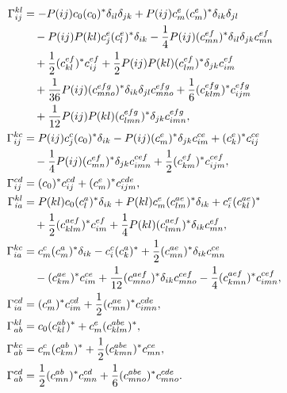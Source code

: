 \documentclass[11pt]{article}
\begin{document}
\begingroup
\small
\begin{align}
 \Gamma^{kl}_{ij}
 &= -P(ij)c_0(c_0)^*\delta_{il}\delta_{jk}
    +P(ij)c_m^e(c_m^e)^*\delta_{ik}\delta_{jl}
 \notag\\
 &\quad
    -P(ij)P(kl)c_j^e(c_l^e)^*\delta_{ik}
    -\frac{1}{4}P(ij)(c_{mn}^{ef})^*
       \delta_{il}\delta_{jk}c_{mn}^{ef}
 \notag\\
 &\quad
    +\frac{1}{2}(c_{kl}^{ef})^*c_{ij}^{ef}
    +\frac{1}{2}P(ij)P(kl)(c_{lm}^{ef})^*
       \delta_{jk}c_{im}^{ef}
 \notag\\
 &\quad
    +\frac{1}{36}P(ij)(c_{mno}^{efg})^*
       \delta_{ik}\delta_{jl}c_{mno}^{efg}
    +\frac{1}{6}(c_{klm}^{efg})^*c_{ijm}^{efg}
 \notag\\
 &\quad
    +\frac{1}{12}P(ij)P(kl)(c_{lmn}^{efg})^*
       \delta_{jk}c_{imn}^{efg},
 \\
 \Gamma^{kc}_{ij}
 &= P(ij)c_j^c(c_0)^*\delta_{ik}
    -P(ij)(c_m^e)^*\delta_{jk}c_{im}^{ce}
    +(c_k^e)^*c_{ij}^{ce}
 \notag\\
 &\quad
    -\frac{1}{4}P(ij)(c_{mn}^{ef})^*\delta_{jk}c_{imn}^{cef}
    +\frac{1}{2}(c_{km}^{ef})^*c_{ijm}^{cef},
 \\
 \Gamma^{cd}_{ij}
 &= (c_0)^*c_{ij}^{cd}+(c_m^e)^*c_{ijm}^{cde},
 \\
 \Gamma^{kl}_{ia}
 &= P(kl)c_0(c_l^a)^*\delta_{ik}
    +P(kl)c_m^e(c_{lm}^{ae})^*\delta_{ik}
    +c_i^e(c_{kl}^{ae})^*
 \notag\\
 &\quad
    +\frac{1}{2}(c_{klm}^{aef})^*c_{im}^{ef}
    +\frac{1}{4}P(kl)(c_{lmn}^{aef})^*\delta_{ik}c_{mn}^{ef},
 \\
 \Gamma^{kc}_{ia}
 &= c_m^c(c_m^a)^*\delta_{ik}-c_i^c(c_k^a)^*
    +\frac{1}{2}(c_{mn}^{ae})^*\delta_{ik}c_{mn}^{ce}
 \notag\\
 &\quad
    -(c_{km}^{ae})^*c_{im}^{ce}
    +\frac{1}{12}(c_{mno}^{aef})^*\delta_{ik}c_{mno}^{cef}
    -\frac{1}{4}(c_{kmn}^{aef})^*c_{imn}^{cef},
 \\
 \Gamma^{cd}_{ia}
 &= (c_m^a)^*c_{im}^{cd}
    +\frac{1}{2}(c_{mn}^{ae})^*c_{imn}^{cde},
 \\
 \Gamma^{kl}_{ab}
 &= c_0(c_{kl}^{ab})^*+c_m^e(c_{klm}^{abe})^*,
 \\
 \Gamma^{kc}_{ab}
 &= c_m^c(c_{km}^{ab})^*
    +\frac{1}{2}(c_{kmn}^{abe})^*c_{mn}^{ce},
 \\
 \Gamma^{cd}_{ab}
 &= \frac{1}{2}(c_{mn}^{ab})^*c_{mn}^{cd}
    +\frac{1}{6}(c_{mno}^{abe})^*c_{mno}^{cde}.
\end{align}
\endgroup
\end{document}
